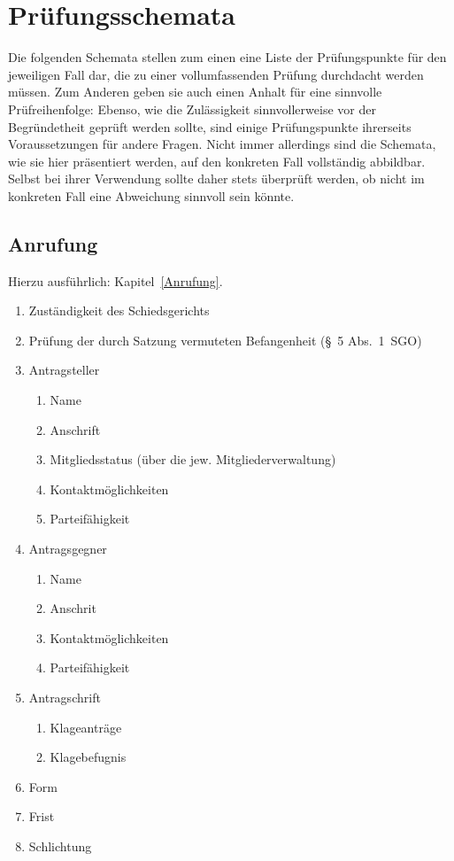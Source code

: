 
\chapter{Prüfungsschemata}
\label{Schemata}

Die folgenden Schemata stellen zum einen eine Liste der Prüfungspunkte für den jeweiligen Fall dar, die zu einer vollumfassenden Prüfung durchdacht werden müssen.
Zum Anderen geben sie auch einen Anhalt für eine sinnvolle Prüfreihenfolge:
Ebenso, wie die Zulässigkeit sinnvollerweise vor der Begründetheit geprüft werden sollte, sind einige Prüfungspunkte ihrerseits Voraussetzungen für andere Fragen.
Nicht immer allerdings sind die Schemata, wie sie hier präsentiert werden, auf den konkreten Fall vollständig abbildbar.
Selbst bei ihrer Verwendung sollte daher stets überprüft werden, ob nicht im konkreten Fall eine Abweichung sinnvoll sein könnte.

\section{Anrufung}
\label{Schemata:Anrufung}
Hierzu ausführlich: Kapitel~\ref{Anrufung}.

\begin{enumerate}[label=\Roman*.]
\item Zuständigkeit des Schiedsgerichts
\item Prüfung der durch Satzung vermuteten Befangenheit (\S~5 Abs.~1~SGO)
\item Antragsteller
	\begin{enumerate}
	\item Name
	\item Anschrift
	\item Mitgliedsstatus (über die jew. Mitgliederverwaltung)
	\item Kontaktmöglichkeiten
	\item Parteifähigkeit
	\end{enumerate}
\item Antragsgegner
	\begin{enumerate}
	\item Name
	\item Anschrit
	\item Kontaktmöglichkeiten
	\item Parteifähigkeit
	\end{enumerate}
\item Antragschrift
	\begin{enumerate}
	\item Klageanträge
	\item Klagebefugnis
	\end{enumerate}
\item Form
\item Frist
\item Schlichtung
\end{enumerate}

